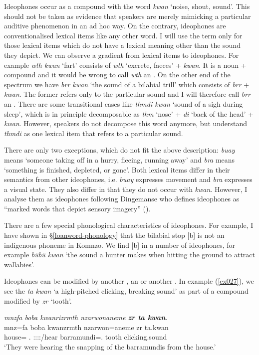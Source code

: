 Ideophones occur as a compound with the word \emph{kwan} `noise, shout, sound'. This should not be taken as evidence that speakers are merely mimicking a particular auditive phenomenon in an ad hoc way. On the contrary, ideophones are conventionalised lexical items like any other word. I will use the term  only for those lexical items which do not have a lexical meaning other than the sound they depict. We can observe a gradient from lexical items to ideophones. For example \emph{wth kwan} `fart' consists of \emph{wth} `excrete, faeces' + \emph{kwan}. It is a noun +  compound and it would be wrong to call \emph{wth} an . On the other end of the spectrum we have \emph{brr kwan} `the sound of a bilabial trill' which consists of \emph{brr} + \emph{kwan}. The former refers only to the particular sound and I will therefore call \emph{brr} an . There are some transitional cases like \emph{thmdi kwan} `sound of a sigh during sleep', which is in principle decomposable as \emph{thm} `nose' + \emph{di} `back of the head' + \emph{kwan}. However, speakers do not decompose this word anymore, but understand \emph{thmdi} as one lexical item that refers to a particular sound.

There are only two exceptions, which do not fit the above description: \emph{buay} means `someone taking off in a hurry, fleeing, running away' and \emph{bra} means `something is finished, depleted, or gone'. Both lexical items differ in their semantics from other ideophones, i.e. \emph{buay} expresses movement and \emph{bra} expresses a visual state. They also differ in that they do not occur with \emph{kwan}. However, I analyse them as ideophones following Dingemanse who defines ideophones as ``marked words that depict sensory imagery'' (\citeyear[655]{Dingemanse:2012fc}).

There are a few special phonological characteristics of ideophones. For example, I have shown in {\S}\ref{loanword-phonology} that the bilabial stop [b] is not an indigenous phoneme in Komnzo. We find [b] in a number of ideophones, for example \emph{bübü kwan} `the sound a hunter makes when hitting the ground to attract wallabies'.

\largerpage
Ideophones can be modified by another , an  or another . In example (\ref{ex027}), we see the  \emph{ta kwan} `a high-pitched clicking, breaking sound' as part of a compound modified by \emph{zr} `tooth'.

\begin{exe}
	\ex \emph{mnzfa boba kwanrizrmth nzarwonaneme \textbf{zr ta kwan}.}\\
	\gll mnz=fa boba kwanzrmth nzarwon=aneme zr ta.kwan\\
	house={\Abl} \Med{}.{\Abl} \Stpl:\Sbj:\Pst:\Dur:\Venit/hear barramundi={\Poss}.{\Nsg} tooth {clicking.sound}\\
	\trans `They were hearing the snapping of the barramundis from the house.'\\ 
	\label{ex027}
\end{exe}

